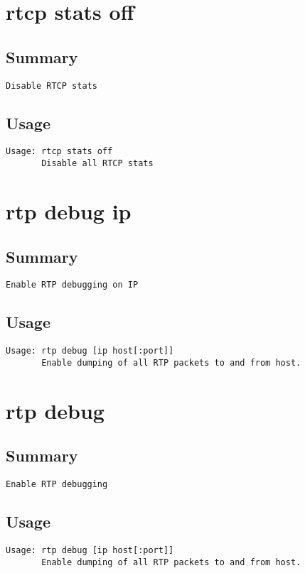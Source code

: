 \section{rtcp stats off}
\subsection{Summary}
\begin{verbatim}
Disable RTCP stats
\end{verbatim}
\subsection{Usage}
\begin{verbatim}
Usage: rtcp stats off
       Disable all RTCP stats

\end{verbatim}


\section{rtp debug ip}
\subsection{Summary}
\begin{verbatim}
Enable RTP debugging on IP
\end{verbatim}
\subsection{Usage}
\begin{verbatim}
Usage: rtp debug [ip host[:port]]
       Enable dumping of all RTP packets to and from host.

\end{verbatim}


\section{rtp debug}
\subsection{Summary}
\begin{verbatim}
Enable RTP debugging
\end{verbatim}
\subsection{Usage}
\begin{verbatim}
Usage: rtp debug [ip host[:port]]
       Enable dumping of all RTP packets to and from host.

\end{verbatim}


